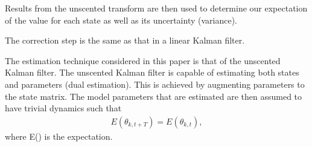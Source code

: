 Results from the unscented transform are then used to determine our expectation of the value for each state as well as its uncertainty (variance).

The correction step is the same as that in a linear Kalman filter.

The estimation technique considered in this paper is that of the unscented Kalman filter. The unscented Kalman filter is capable of estimating both states and parameters (dual estimation). This is achieved by augmenting parameters to the state matrix. The model parameters that are estimated are then assumed to have trivial dynamics such that \begin{align}
E(\theta_{k,t+T}) = E(\theta_{k,t}),
\end{align} where E(\cdot) is the expectation.




